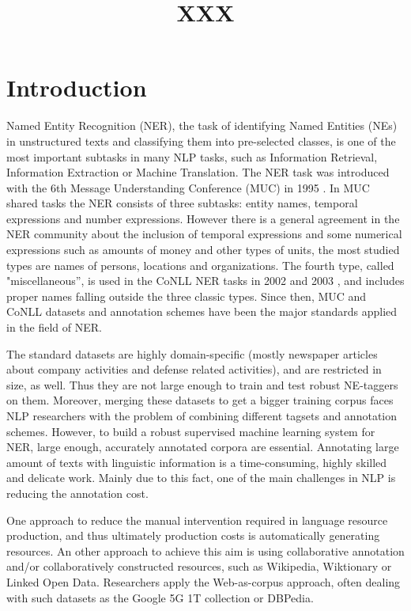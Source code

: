 \documentclass[11pt]{article}
\title{XXX}
\date{}
\begin{document}
\maketitle
\begin{abstract}
  
\end{abstract}

\section{Introduction}

Named Entity Recognition (NER), the task of identifying Named Entities (NEs) in unstructured texts and classifying them into pre-selected classes, is one of the most important subtasks in many NLP tasks, such as Information Retrieval, Information Extraction or Machine Translation. The NER task was introduced with the 6th Message Understanding Conference (MUC) in 1995 \cite{Grishman:96}. In MUC shared tasks the NER consists of three subtasks: entity names, temporal expressions and number expressions. However there is a general agreement in the NER community about the inclusion of temporal expressions and some numerical expressions such as amounts of money and other types of units, the most studied types are names of persons, locations and organizations. The fourth type, called "miscellaneous'', is used in the CoNLL NER tasks in 2002 \cite{Tjong:02} and 2003 \cite{Tjong:03}, and includes proper names falling outside the three classic types. Since then, MUC and CoNLL datasets and annotation schemes have been the major standards applied in the field of NER. 

The standard datasets are highly domain-specific (mostly newspaper articles about company activities and defense related activities), and are restricted in size, as well. Thus they are not large enough to train and test robust NE-taggers on them. Moreover, merging these datasets to get a bigger training corpus faces NLP researchers with the problem of combining different tagsets and annotation schemes. However, to build a robust supervised machine learning system for NER, large enough, accurately annotated corpora are essential. Annotating large amount of texts with linguistic information is a time-consuming, highly skilled and delicate work. Mainly due to this fact, one of the main challenges in NLP is reducing the annotation cost. 

One approach to reduce the manual intervention required in language resource production, and thus ultimately production costs is automatically generating resources. An other approach to achieve this aim is using collaborative annotation and/or collaboratively constructed resources, such as Wikipedia, Wiktionary or Linked Open Data. Researchers apply the Web-as-corpus approach, often dealing with such datasets as the Google 5G 1T collection or DBPedia.  
\end{document}
